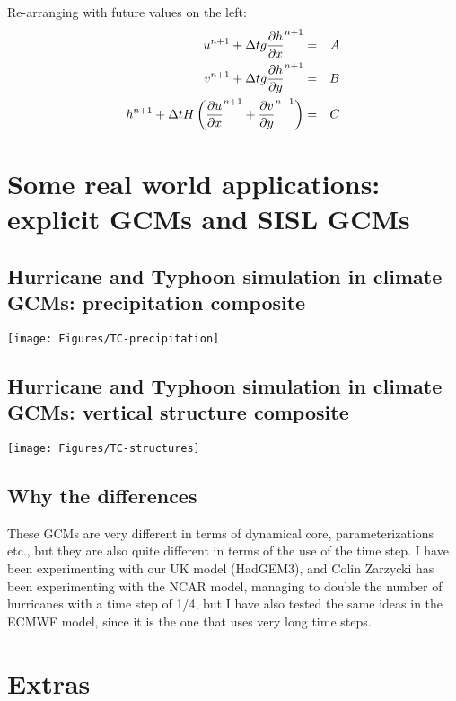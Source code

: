 Re-arranging with future values on the left:
\begin{eqnarray*}
	u^{n+1}+\Delta t g \frac{\partial h}{\partial x}^{n+1} & = & A \\
	v^{n+1}+\Delta t g \frac{\partial h}{\partial y}^{n+1} & = & B \\
	h^{n+1}+\Delta t H \left( \frac{\partial u}{\partial x}^{n+1}+\frac{\partial v}{\partial y}^{n+1} \right) & = & C
\end{eqnarray*}
	


\section{Some real world applications: explicit GCMs and SISL GCMs}
\subsection{Hurricane and Typhoon simulation in climate GCMs: precipitation composite}

	\begin{center}	
		\texttt{[image: Figures/TC-precipitation]}
	\end{center}
	

\subsection{Hurricane and Typhoon simulation in climate GCMs: vertical structure composite}
	\begin{center}	
		\texttt{[image: Figures/TC-structures]}
	\end{center}
	

\subsection{Why the differences}

	These GCMs are very different in terms of dynamical core, parameterizations etc., but they are also quite different in terms of the use of the time step. I have been experimenting with our UK model (HadGEM3), and Colin Zarzycki has been experimenting with the NCAR model, managing to double the number of hurricanes with a time step of 1/4, but I have also tested the same ideas in the ECMWF model, since it is the one that uses very long time steps.
	

\section{Extras}

